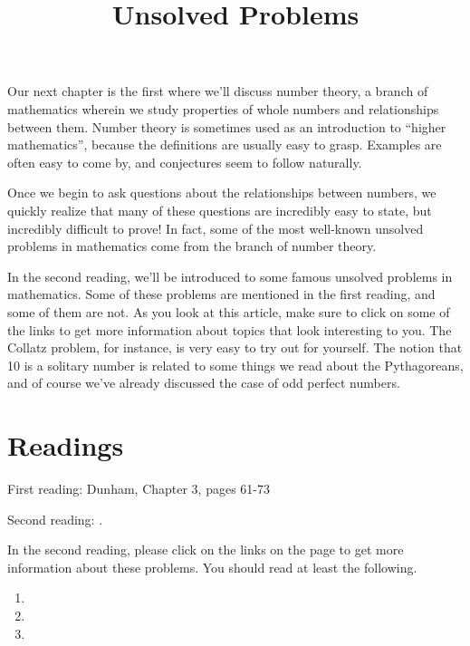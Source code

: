 \documentclass[nooutcomes]{ximera}
\title{Unsolved Problems}
\begin{document}
\begin{abstract}
    
\end{abstract}
\maketitle



Our next chapter is the first where we'll discuss number theory, a branch of mathematics wherein we study properties of whole numbers and relationships between them.  Number theory is sometimes used as an introduction to ``higher mathematics'', because the definitions are usually easy to grasp.  Examples are often easy to come by, and conjectures seem to follow naturally.  

Once we begin to ask questions about the relationships between numbers, we quickly realize that many of these questions are incredibly easy to state, but incredibly difficult to prove!  In fact, some of the most well-known unsolved problems in mathematics come from the branch of number theory.

In the second reading, we'll be introduced to some famous unsolved problems in mathematics.  Some of these problems are mentioned in the first reading, and some of them are not.  As you look at this article, make sure to click on some of the links to get more information about topics that look interesting to you.  The Collatz problem, for instance, is very easy to try out for yourself.  The notion that 10 is a solitary number is related to some things we read about the Pythagoreans, and of course we've already discussed the case of odd perfect numbers.


\section{Readings}
First reading: Dunham, Chapter 3, pages 61-73

Second reading: .

In the second reading, please click on the links on the page to get more information about these problems.  You should read at least the following.
\begin{enumerate}
    \item {}
    \item {}
    \item {}
\end{enumerate}
\end{document}
